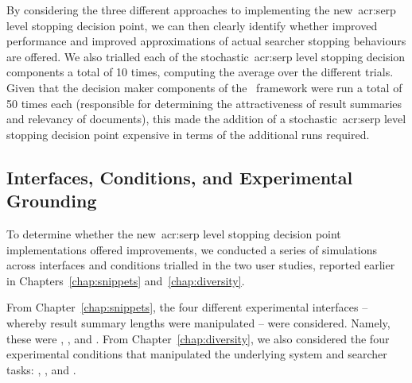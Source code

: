 By considering the three different approaches to implementing the new~\gls{acr:serp} level stopping decision point, we can then clearly identify whether improved performance and improved approximations of actual searcher stopping behaviours are offered. We also trialled each of the stochastic~\gls{acr:serp} level stopping decision components a total of 10 times, computing the average over the different trials. Given that the decision maker components of the \simiir~framework were run a total of 50 times each (responsible for determining the attractiveness of result summaries and relevancy of documents), this made the addition of a stochastic~\gls{acr:serp} level stopping decision point expensive in terms of the additional runs required.


\subsection{Interfaces, Conditions, and Experimental Grounding}\label{sec:serp:method:probscosts}
To determine whether the new~\gls{acr:serp} level stopping decision point implementations offered improvements, we conducted a series of simulations across interfaces and conditions trialled in the two user studies, reported earlier in Chapters~\ref{chap:snippets} and~\ref{chap:diversity}.

From Chapter~\ref{chap:snippets}, the four different experimental interfaces -- whereby result summary lengths were manipulated -- were considered. Namely, these were , ,  and . From Chapter~\ref{chap:diversity}, we also considered the four experimental conditions that manipulated the underlying system and searcher tasks: , ,  and .

